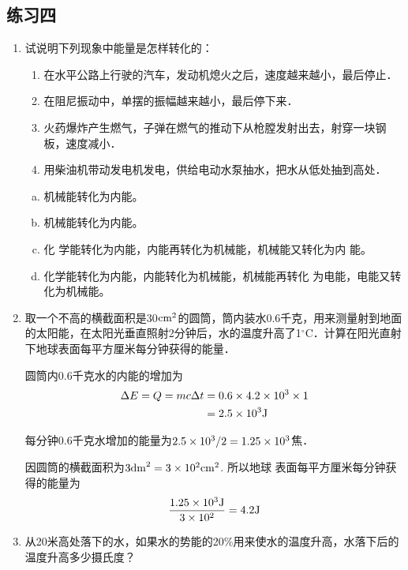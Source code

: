 \subsection{练习四}

\begin{enumerate}
	\item 试说明下列现象中能量是怎样转化的：
	\begin{enumerate}
		\item 在水平公路上行驶的汽车，发动机熄火之后，速度越来越小，最后停止．
		\item 在阻尼振动中，单摆的振幅越来越小，最后停下来．
		\item 火药爆炸产生燃气，子弹在燃气的推动下从枪膛发射出去，射穿一块钢板，速度减小．
		\item 用柴油机带动发电机发电，供给电动水泵抽水，把水从低处抽到高处．
	\end{enumerate}

\begin{solution}
\begin{enumerate}[(a)]
    \item 机械能转化为内能。\item 机械能转化为内能。\item 化
学能转化为内能，内能再转化为机械能，机械能又转化为内
能。\item 化学能转化为内能，内能转化为机械能，机械能再转化
为电能，电能又转化为机械能。
\end{enumerate}
\end{solution}


\item 取一个不高的横截面积是30${\rm cm^2}$的圆筒，筒内装水0.6千克，用来测量射到地面的太阳能，在太阳光垂直照射2分钟后，水的温度升高了1$^\circ$C．计算在阳光直射下地球表面每平方厘米每分钟获得的能量．

\begin{solution}
圆筒内0.6千克水的内能的增加为
\[\begin{split}
   \Delta E=Q=mc\Delta t&=0.6\times4.2\times10^3\times1\\
&=2.5\times10^3{\rm J} 
\end{split}\]

每分钟0.6千克水增加的能量为$2.5\times 10^3/2=1.25\times
10^3$焦．

因圆筒的横截面积为$3{\rm dm}^2=3\times10^2{\rm cm}^2$. 所以地球
表面每平方厘米每分钟获得的能量为
\[\frac{1.25\times10^3{\rm J}}{3\times10^2}=4.2{\rm J}\]
\end{solution}
\item 从20米高处落下的水，如果水的势能的20\%用来使水的温度升高，水落下后的温度升高多少摄氏度？


\end{enumerate}
